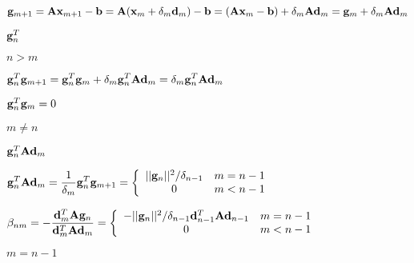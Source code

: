 \documentclass{article}
\def\lthtmlcheckvsize{\ifdim\ht\sizebox<\vsize 
  \ifdim\wd\sizebox<\hsize\expandafter\hfill\fi \expandafter\vfill
  \else\expandafter\vss\fi}%
\begin{document}
{\newpage\clearpage
{}%
$\displaystyle {\bf g}_{m+1}={\bf A}{\bf x}_{m+1}-{\bf b}
={\bf A}({\bf x}_m+\delta_m{\bf d}_m)-{\bf b}
=({\bf A}{\bf x}_m-{\bf b})+\delta_m{\bf A}{\bf d}_m
={\bf g}_m+\delta_m{\bf A}{\bf d}_m$%
\lthtmlindisplaymathZ
\lthtmlcheckvsize\clearpage}

{\newpage\clearpage
{}%
$ {\bf g}_n^T$%
\lthtmlindisplaymathZ
\lthtmlcheckvsize\clearpage}

{\newpage\clearpage
{}%
$ n>m$%
\lthtmlindisplaymathZ
\lthtmlcheckvsize\clearpage}

{\newpage\clearpage
{}%
$\displaystyle {\bf g}_n^T{\bf g}_{m+1}={\bf g}_n^T{\bf g}_m+\delta_m{\bf g}_n^T{\bf A}{\bf d}_m
=\delta_m{\bf g}_n^T{\bf A}{\bf d}_m$%
\lthtmlindisplaymathZ
\lthtmlcheckvsize\clearpage}

{\newpage\clearpage
{}%
$ {\bf g}_n^T{\bf g}_m=0$%
\lthtmlindisplaymathZ
\lthtmlcheckvsize\clearpage}

{\newpage\clearpage
{}%
$ m\ne n$%
\lthtmlindisplaymathZ
\lthtmlcheckvsize\clearpage}

{\newpage\clearpage
{}%
$ {\bf g}_n^T{\bf A}{\bf d}_m$%
\lthtmlindisplaymathZ
\lthtmlcheckvsize\clearpage}

{\newpage\clearpage
{}%
$\displaystyle {\bf g}_n^T{\bf A}{\bf d}_m
=\frac{1}{\delta_m} {\bf g}_n^T{\bf g}_{m+1}
=\left\{\begin{array}{cl}
||{\bf g}_n||^2/\delta_{n-1}&m=n-1\\0&m<n-1\end{array}\right.$%
\lthtmlindisplaymathZ
\lthtmlcheckvsize\clearpage}

{\newpage\clearpage
{}%
$\displaystyle \beta_{nm}=-\frac{{\bf d}_m^T{\bf A}{\bf g}_n}{{\bf d}^T_m{\bf A}{\bf d}_m}
=\left\{\begin{array}{cl}-||{\bf g}_n||^2/\delta_{n-1}{\bf d}_{n-1}^T{\bf A}{\bf d}_{n-1}
&m=n-1
\\0&m<n-1\end{array}\right.$%
\lthtmlindisplaymathZ
\lthtmlcheckvsize\clearpage}

{\newpage\clearpage
{}%
$ m=n-1$%
\lthtmlindisplaymathZ
\lthtmlcheckvsize\clearpage}
\end{document}
